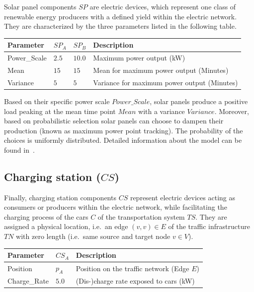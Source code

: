 Solar panel components $SP$ are electric devices, which represent one class of renewable energy producers with a defined yield within the electric network. They are characterized by the three parameters listed in the following table.

\begin{table}[h]
	\renewcommand{\arraystretch}{1.3}
	\centering
	\begin{tabularx}{\columnwidth}{lllX}
		\hline
		\textbf{Parameter}                     & \textbf{$SP_{A}$} & \textbf{$SP_{B}$} & \textbf{Description} \\ \hline
		Power\_Scale                       	   & $2.5$ & $10.0$ & Maximum power output (kW) \\
		Mean                       	  		  & $15$ & $15$ & Mean for maximum power output (Minutes) \\
		Variance                       	       & $5$ & $5$ & Variance for maximum power output (Minutes) \\ \hline
	\end{tabularx}
\end{table}

Based on their specific power scale $Power\_Scale$, solar panels produce a positive load peaking at the mean time point $Mean$ with a variance $Variance$. Moreover, based on probabilistic selection solar panels can choose to dampen their production (known as maximum power point tracking). The probability of the choices is uniformly distributed. Detailed information about the model can be found in~\cite{hackenberg2014rapid}.

\subsection{Charging station ($CS$)}
\label{section:charging_station}

Finally, charging station components $CS$ represent electric devices acting as consumers or producers within the electric network, while facilitating the charging process of the cars $C$ of the transportation system $TS$. They are assigned a physical location, i.e.\ an edge $(v,v) \in E$ of the traffic infrastructure $TN$ with zero length (i.e.\ same source and target node $v \in V$). 

\begin{table}[h]
	\renewcommand{\arraystretch}{1.3}
	\centering
	\begin{tabularx}{\columnwidth}{llX}
		\hline
		\textbf{Parameter}      & \textbf{$CS_{A}$} & \textbf{Description} \\ \hline
		Position      			& $p_A$ & Position on the traffic network (Edge $E$) \\  
		Charge\_Rate        	& $5.0$ & (Dis-)charge rate exposed to cars (kW)     \\ \hline
	\end{tabularx}
\end{table}

